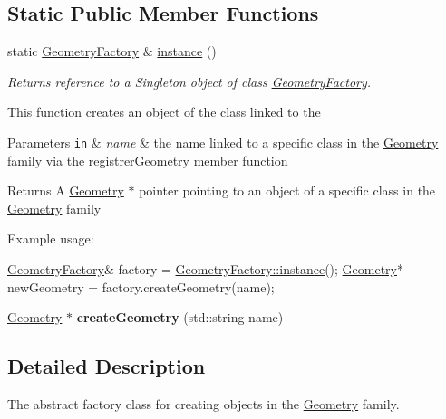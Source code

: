 \subsection*{Static Public Member Functions}
\begin{DoxyCompactItemize}
\item 
static \hyperlink{classGeometryFactory}{Geometry\-Factory} \& \hyperlink{classGeometryFactory_a13a3c88c7f915f7e07e3de9078098acd}{instance} ()
\begin{DoxyCompactList}\small\item\em Returns reference to a Singleton object of class \hyperlink{classGeometryFactory}{Geometry\-Factory}. \end{DoxyCompactList}\end{DoxyCompactItemize}
\label{_amgrp01747264fe7bf50731df0522c351974e}%
This function creates an object of the class linked to the


\begin{DoxyParams}[1]{Parameters}
\mbox{\tt in}  & {\em name} & the name linked to a specific class in the \hyperlink{classGeometry}{Geometry} family via the registrer\-Geometry member function\\
\hline
\end{DoxyParams}
\begin{DoxyReturn}{Returns}
A \hyperlink{classGeometry}{Geometry} $\ast$ pointer pointing to an object of a specific class in the \hyperlink{classGeometry}{Geometry} family
\end{DoxyReturn}
Example usage\-: 
\begin{DoxyCode}
\hyperlink{classGeometryFactory}{GeometryFactory}& factory = \hyperlink{classGeometryFactory_a13a3c88c7f915f7e07e3de9078098acd}{GeometryFactory::instance}();
\hyperlink{classGeometry}{Geometry}* newGeometry = factory.createGeometry(name);
\end{DoxyCode}
 \begin{DoxyCompactItemize}
\item 
\hypertarget{classGeometryFactory_a9c1803d0eea227f9884bb3862030e6c5}{\hyperlink{classGeometry}{Geometry} $\ast$ {\bfseries create\-Geometry} (std\-::string name)}\label{classGeometryFactory_a9c1803d0eea227f9884bb3862030e6c5}

\end{DoxyCompactItemize}


\subsection{Detailed Description}
The abstract factory class for creating objects in the \hyperlink{classGeometry}{Geometry} family. 

